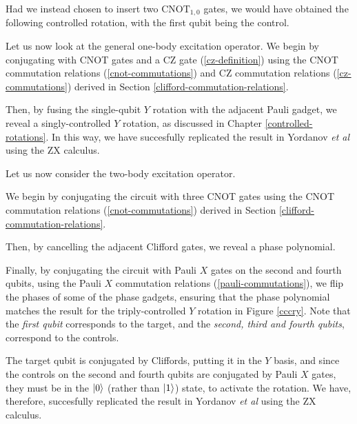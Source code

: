 
Had we instead chosen to insert two $\text{CNOT}_{1, 0}$ gates, we would have obtained the following controlled rotation, with the first qubit being the control.


Let us now look at the general one-body excitation operator. We begin by conjugating with CNOT gates and a CZ gate (\ref{cz-definition}) using the CNOT commutation relations (\ref{cnot-commutations}) and CZ commutation relations (\ref{cz-commutations}) derived in Section \ref{clifford-commutation-relations}.


Then, by fusing the single-qubit $Y$ rotation with the adjacent Pauli gadget, we reveal a singly-controlled $Y$ rotation, as discussed in Chapter \ref{controlled-rotations}. In this way, we have succesfully replicated the result in Yordanov \textit{et al} \cite{Yordanov2020} using the ZX calculus.


Let us now consider the two-body excitation operator.


We begin by conjugating the circuit with three CNOT gates using the CNOT commutation relations (\ref{cnot-commutations}) derived in Section \ref{clifford-commutation-relations}.


Then, by cancelling the adjacent Clifford gates, we reveal a phase polynomial.


Finally, by conjugating the circuit with Pauli $X$ gates on the second and fourth qubits, using the Pauli $X$ commutation relations (\ref{pauli-commutations}), we flip the phases of some of the phase gadgets, ensuring that the phase polynomial matches the result for the triply-controlled $Y$ rotation in Figure \ref{cccry}. Note that the \textit{first qubit} corresponds to the target, and the \textit{second, third and fourth qubits}, correspond to the controls.


The target qubit is conjugated by Cliffords, putting it in the $Y$ basis, and since the controls on the second and fourth qubits are conjugated by Pauli $X$ gates, they must be in the $\ket 0$ (rather than $\ket 1$) state, to activate the rotation. We have, therefore, succesfully replicated the result in Yordanov \textit{et al} \cite{Yordanov2020} using the ZX calculus.

